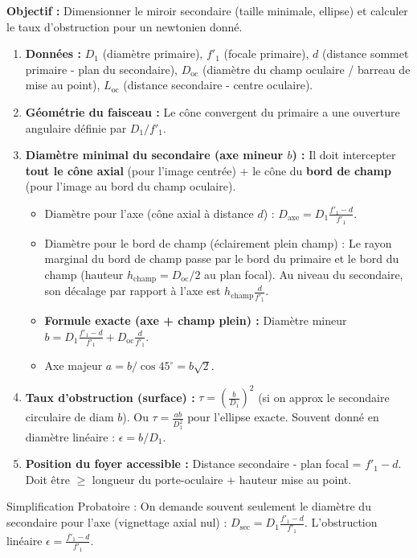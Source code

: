 \documentclass[11pt]{article}
\newcommand{\cle}[1]{{\popxbold\color{popdark}#1}}
\begin{document}
\begin{methode}
\textbf{Objectif :} Dimensionner le miroir secondaire (taille minimale, ellipse) et calculer le taux d'obstruction pour un newtonien donné.
\begin{enumerate}
    \item \textbf{Données :} $D_1$ (diamètre primaire), $f'_1$ (focale primaire), $d$ (distance sommet primaire - plan du secondaire), $D_{\text{oc}}$ (diamètre du champ oculaire / barreau de mise au point), $L_{\text{oc}}$ (distance secondaire - centre oculaire).
    \item \textbf{Géométrie du faisceau :} Le cône convergent du primaire a une ouverture angulaire définie par $D_1/f'_1$.
    \item \textbf{Diamètre minimal du secondaire (axe mineur $b$) :} Il doit intercepter \textbf{tout le cône axial} (pour l'image centrée) + le cône du \textbf{bord de champ} (pour l'image au bord du champ oculaire).
    \begin{itemize}
        \item Diamètre pour l'axe (cône axial à distance $d$) : $D_{\text{axe}} = D_1 \frac{f'_1 - d}{f'_1}$.
        \item Diamètre pour le bord de champ (éclairement plein champ) : Le rayon marginal du bord de champ passe par le bord du primaire et le bord du champ (hauteur $h_{\text{champ}} = D_{\text{oc}}/2$ au plan focal). Au niveau du secondaire, son décalage par rapport à l'axe est $h_{\text{champ}} \frac{d}{f'_1}$.
        \item \textbf{Formule exacte (axe + champ plein) :} Diamètre mineur $b = D_1 \frac{f'_1 - d}{f'_1} + D_{\text{oc}} \frac{d}{f'_1}$.
        \item Axe majeur $a = b / \cos 45^\circ = b\sqrt{2}$.
    \end{itemize}
    \item \textbf{Taux d'obstruction (surface) :} $\tau = \left(\frac{b}{D_1}\right)^2$ (si on approx le secondaire circulaire de diam $b$). Ou $\tau = \frac{a b}{D_1^2}$ pour l'ellipse exacte. Souvent donné en diamètre linéaire : $\epsilon = b/D_1$.
    \item \textbf{Position du foyer accessible :} Distance secondaire - plan focal = $f'_1 - d$. Doit être $\ge$ longueur du porte-oculaire + hauteur mise au point.
\end{enumerate}
\cle{Simplification Probatoire :} On demande souvent seulement le diamètre du secondaire pour l'axe (vignettage axial nul) : $D_{\text{sec}} = D_1 \frac{f'_1 - d}{f'_1}$. L'obstruction linéaire $\epsilon = \frac{f'_1 - d}{f'_1}$.
\end{methode}
\end{document}
